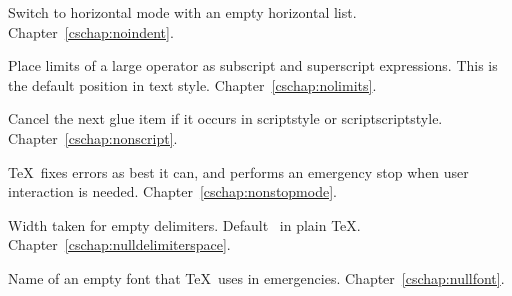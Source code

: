 \begin{glossinventory}
\item [\cs{noindent}] 
      Switch to horizontal mode with an empty horizontal list.
Chapter~\ref{cschap:noindent}.

\item [\cs{nolimits}]
      Place limits of a large operator as subscript and 
      superscript expressions.
      This is the default position in text style.
Chapter~\ref{cschap:nolimits}.

\item [\cs{nonscript}]
      Cancel the next glue item if it occurs in 
      scriptstyle or scriptscriptstyle.
Chapter~\ref{cschap:nonscript}.

\item [\cs{nonstopmode}]
      \TeX\ fixes errors as best it can,
      and performs an emergency stop
      when user interaction is needed.
Chapter~\ref{cschap:nonstopmode}.

\item [\cs{nulldelimiterspace}]
      Width taken for empty delimiters. 
      Default~\n{1.2pt} in plain \TeX.
Chapter~\ref{cschap:nulldelimiterspace}.

\item [\cs{nullfont}]
      Name of an empty font that \TeX\ uses in emergencies.
Chapter~\ref{cschap:nullfont}.


\end{glossinventory}
